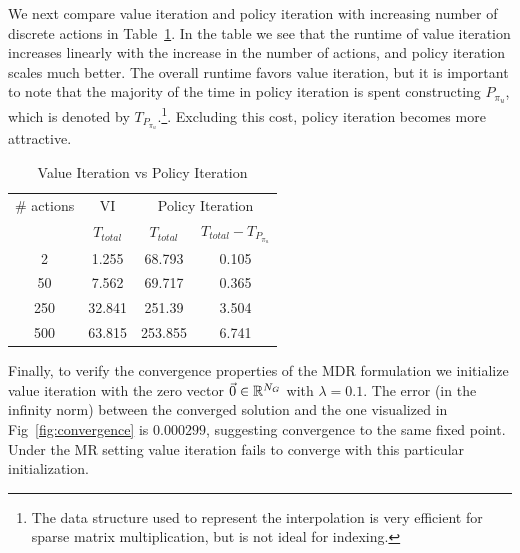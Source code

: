 We next compare value iteration and policy iteration with increasing number of discrete actions in Table~\ref{tab:v_vs_p}. In the table we see that the runtime of value iteration increases linearly with the increase in the number of actions, and policy iteration scales much better. The overall runtime favors value iteration, but it is important to note that the majority of the time in policy iteration is spent constructing $P_{\pi_u}$, which is denoted by $T_{P_{\pi_u}}$.\footnote{The data structure used to represent the interpolation is very efficient for sparse matrix multiplication, but is not ideal for indexing.}. Excluding this cost, policy iteration becomes more attractive.
\begin{table}
\centering
\caption{Value Iteration vs Policy Iteration}
\label{tab:v_vs_p}
\begin{tabular}{|c| c| c| c|}
\hline
\# actions & VI & \multicolumn{2}{|c|}{Policy Iteration} \\ \cline{3-4}
 &  $T_{total} $ & $T_{total}$ & $T_{total} - T_{P_{\pi_u}}$ \\ \hline
2 & 1.255  & 68.793  & 0.105 \\ \hline
50 &  7.562 &  69.717 & 0.365 \\ \hline
250 & 32.841 &  251.39 & 3.504 \\ \hline
500 & 63.815 &  253.855 & 6.741 \\
\hline
\end{tabular}
\end{table}

Finally, to verify the convergence properties of the MDR formulation we initialize value iteration with the zero vector $\vec{0}\in \mathbb{R}^{N_G}$ with $\lambda=0.1$. The error (in the infinity norm) between the converged solution and the one visualized in Fig~\ref{fig:convergence} is $0.000299$, suggesting convergence to the same fixed point. Under the MR setting value iteration fails to converge with this particular initialization.


